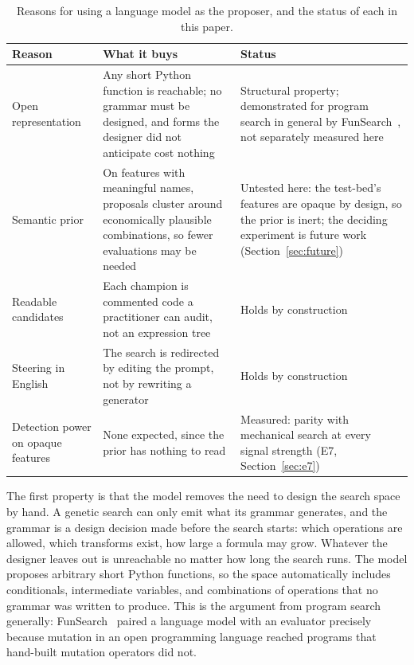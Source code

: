 \documentclass[11pt]{article}
\begin{document}
\begin{table}[htbp]
\centering
\caption{Reasons for using a language model as the proposer, and the status of each in this paper.}
\label{tab:whyllm}
\small
\begin{tabular}{p{3.4cm} p{5.3cm} p{5.3cm}}
\toprule
Reason & What it buys & Status \\
\midrule
Open representation & Any short Python function is reachable; no grammar must be designed, and forms
the designer did not anticipate cost nothing & Structural property; demonstrated for program search in
general by FunSearch~\cite{funsearch}, not separately measured here \\
\addlinespace
Semantic prior & On features with meaningful names, proposals cluster around economically plausible
combinations, so fewer evaluations may be needed & Untested here: the test-bed's features are opaque by
design, so the prior is inert; the deciding experiment is future work (Section~\ref{sec:future}) \\
\addlinespace
Readable candidates & Each champion is commented code a practitioner can audit, not an expression
tree & Holds by construction \\
\addlinespace
Steering in English & The search is redirected by editing the prompt, not by rewriting a
generator & Holds by construction \\
\addlinespace
Detection power on opaque features & None expected, since the prior has nothing to read & Measured:
parity with mechanical search at every signal strength (E7, Section~\ref{sec:e7}) \\
\bottomrule
\end{tabular}
\end{table}

The first property is that the model removes the need to design the search space by hand. A genetic
search can only emit what its grammar generates, and the grammar is a design decision made before the
search starts: which operations are allowed, which transforms exist, how large a formula may grow.
Whatever the designer leaves out is unreachable no matter how long the search runs. The model proposes
arbitrary short Python functions, so the space automatically includes conditionals, intermediate
variables, and combinations of operations that no grammar was written to produce. This is the argument
from program search generally: FunSearch~\cite{funsearch} paired a language model with an evaluator
precisely because mutation in an open programming language reached programs that hand-built mutation
operators did not.
\end{document}
